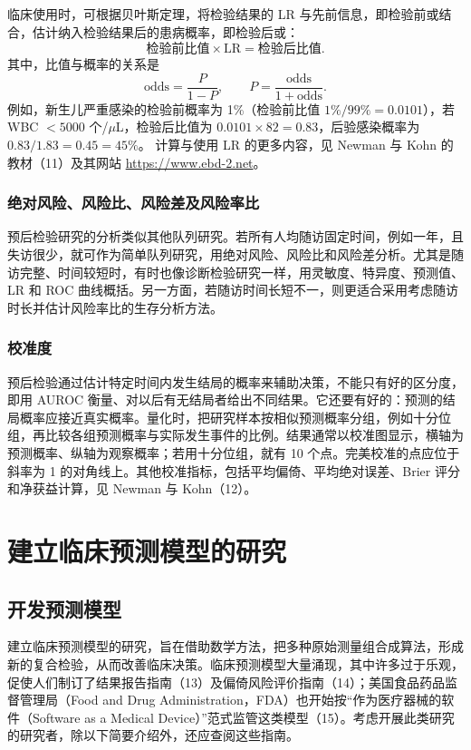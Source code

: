临床使用时，可根据贝叶斯定理，将检验结果的 LR 与先前信息，即检验前或结合，估计纳入检验结果后的患病概率，即检验后或：
\[
\text{检验前比值}\times\mathrm{LR}=\text{检验后比值}.
\]
其中，比值与概率的关系是
\[
\mathrm{odds}=\frac{P}{1-P},\qquad P=\frac{\mathrm{odds}}{1+\mathrm{odds}}.
\]
例如，新生儿严重感染的检验前概率为 1\%（检验前比值 $1\%/99\%=0.0101$），若 WBC $<5000$ 个/$\mu$L，检验后比值为 $0.0101\times82=0.83$，后验感染概率为 $0.83/1.83=0.45=45\%$。
计算与使用 LR 的更多内容，见 Newman 与 Kohn 的教材（11）及其网站 \url{https://www.ebd-2.net}。

\subsubsection{绝对风险、风险比、风险差及风险率比}
预后检验研究的分析类似其他队列研究。若所有人均随访固定时间，例如一年，且失访很少，就可作为简单队列研究，用绝对风险、风险比和风险差分析。尤其是随访完整、时间较短时，有时也像诊断检验研究一样，用灵敏度、特异度、预测值、LR 和 ROC 曲线概括。另一方面，若随访时间长短不一，则更适合采用考虑随访时长并估计风险率比的生存分析方法。

\subsubsection{校准度}
预后检验通过估计特定时间内发生结局的概率来辅助决策，不能只有好的区分度，即用 AUROC 衡量、对以后有无结局者给出不同结果。它还要有好的：预测的结局概率应接近真实概率。量化时，把研究样本按相似预测概率分组，例如十分位组，再比较各组预测概率与实际发生事件的比例。结果通常以校准图显示，横轴为预测概率、纵轴为观察概率；若用十分位组，就有 10 个点。完美校准的点应位于斜率为 1 的对角线上。其他校准指标，包括平均偏倚、平均绝对误差、Brier 评分和净获益计算，见 Newman 与 Kohn（12）。

\section{建立临床预测模型的研究}
\subsection{开发预测模型}
建立临床预测模型的研究，旨在借助数学方法，把多种原始测量组合成算法，形成新的复合检验，从而改善临床决策。临床预测模型大量涌现，其中许多过于乐观，促使人们制订了结果报告指南（13）及偏倚风险评价指南（14）；美国食品药品监督管理局（Food and Drug Administration，FDA）也开始按“作为医疗器械的软件（Software as a Medical Device）”范式监管这类模型（15）。考虑开展此类研究的研究者，除以下简要介绍外，还应查阅这些指南。

